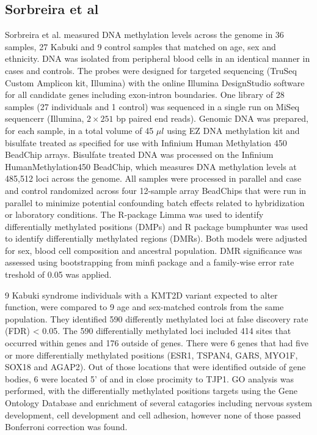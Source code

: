 \subsection{Sorbreira et al}
Sorbreira et al. \cite{sobreira2017patients} measured DNA methylation levels across the genome in 36 samples, 27 Kabuki and 9 control samples that matched on age, sex and ethnicity. DNA was isolated from peripheral blood cells in an identical manner in cases and controls. The probes were designed for targeted sequencing (TruSeq Custom Amplicon kit, Illumina) with the online Illumina DesignStudio software for all candidate genes including exon-intron boundaries. One library of 28 samples (27 individuals and 1 control) was sequenced in a single run on MiSeq sequencerr (Illumina, $2\times251$ bp paired end reads). %
Genomic DNA was prepared, for each sample, in a total volume of 45 $\mu l$ using EZ DNA methylation kit and bisulfate treated as specified for use with Infinium Human Methylation 450 BeadChip arrays. Bisulfate treated DNA was processed on the Infinium HumanMethylation450 BeadChip, which measures DNA methylation levels at 485,512 loci across the genome. All samples were processed in parallel and case and control randomized across four 12-sample array BeadChips that were run in parallel to minimize potential confounding batch effects related to hybridization or laboratory conditions. The R-package Limma was used to identify differentially methylated positions (DMPs) and R package bumphunter was used to identify differentially methylated regions (DMRs). Both models were adjusted for sex, blood cell composition and ancestral population. DMR significance was assessed using bootstrapping from minfi package and a family-wise error rate treshold of 0.05 was applied. %

9  Kabuki syndrome individuals with a KMT2D variant expected to alter function, were compared to 9 age and sex-matched controls from the same population. They identified 590 differently methylated loci at false discovery rate (FDR) < 0.05. The 590 differentially methylated loci included 414 sites that occurred within genes and 176 outside of genes. There were 6 genes that had five or more differentially methylated positions (ESR1, TSPAN4, GARS, MYO1F, SOX18 and AGAP2). Out of those locations that were identified outside of gene bodies, 6 were located 5' of and in close procimity to TJP1. GO analysis was performed, with the differentially methylated positions targets using the Gene Ontology Database and enrichment of several catagories including nervous system development, cell development and cell adhesion, however none of those passed Bonferroni correction was found. 

